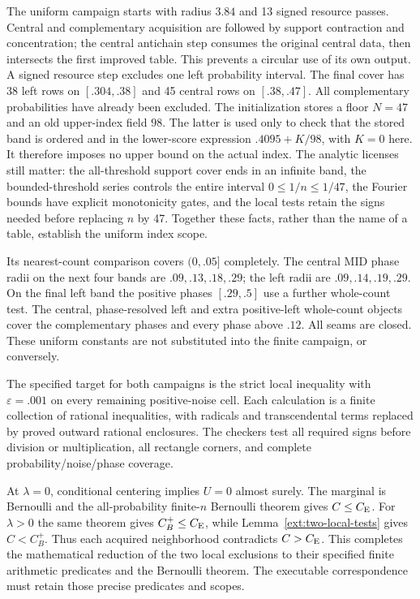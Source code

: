 The uniform campaign starts with radius $3.84$ and 13 signed resource
passes. Central and complementary acquisition are followed by support
contraction and concentration; the central antichain step consumes the
original central data, then intersects the first improved table. This
prevents a circular use of its own output. A signed resource step
excludes one left probability interval. The final cover has 38 left
rows on $[.304,.38]$ and 45 central rows on $[.38,.47]$.
All complementary probabilities have already been excluded.
The initialization stores a floor $N=47$ and an old upper-index field
$98$. The latter is used only to check that the stored band is ordered
and in the lower-score expression $.4095+K/98$, with $K=0$ here.
It therefore imposes no upper bound on the actual index. The analytic
licenses still matter: the all-threshold support cover ends in an
infinite band, the bounded-threshold series controls the entire interval
$0\le1/n\le1/47$, the Fourier bounds have explicit monotonicity gates,
and the local tests retain the signs needed before replacing $n$ by 47.
Together these facts, rather than the name of a table, establish the
uniform index scope.

Its nearest-count comparison covers $(0,.05]$ completely. The central
MID phase radii on the next four bands are $.09,.13,.18,.29$; the left
radii are $.09,.14,.19,.29$. On the final left band the positive
phases $[.29,.5]$ use a further whole-count test. The central,
phase-resolved left and extra positive-left whole-count objects cover
the complementary phases and every phase above $.12$. All seams are
closed. These uniform constants are not substituted into the finite
campaign, or conversely.

The specified target for both campaigns is the strict local inequality
with $\varepsilon=.001$ on every remaining positive-noise cell.
Each calculation is a finite
collection of rational inequalities, with radicals and transcendental
terms replaced by proved outward rational enclosures. The checkers
test all required signs before division or multiplication, all rectangle
corners, and complete probability/noise/phase coverage.

At $\lambda=0$, conditional centering implies $U=0$ almost surely.
The marginal is Bernoulli and the all-probability finite-$n$ Bernoulli
theorem gives $C\le C_{\mathrm E}$. For $\lambda>0$ the same theorem gives
$C_B^+\le C_{\mathrm E}$, while Lemma~\ref{ext:two-local-tests} gives
$C<C_B^+$. Thus each acquired neighborhood contradicts $C>C_{\mathrm E}$.
This completes the mathematical reduction of the two local exclusions
to their specified finite arithmetic predicates and the Bernoulli
theorem. The executable correspondence must retain those precise
predicates and scopes.
